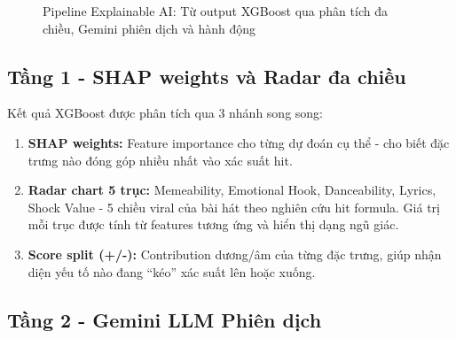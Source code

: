 \documentclass[12pt,a4paper]{report}
\begin{document}
\begin{figure}[H]
{
    }
    \caption{Pipeline Explainable AI: Từ output XGBoost qua phân tích đa chiều, Gemini phiên dịch và hành động}
    \label{fig:xai_pipeline}
\end{figure}

\subsection{Tầng 1 - SHAP weights và Radar đa chiều}

Kết quả XGBoost được phân tích qua 3 nhánh song song:
\begin{enumerate}
    \item \textbf{SHAP weights:} Feature importance cho từng dự đoán cụ thể - cho biết đặc trưng nào đóng góp nhiều nhất vào xác suất hit.
    \item \textbf{Radar chart 5 trục:} Memeability, Emotional Hook, Danceability, Lyrics, Shock Value - 5 chiều viral của bài hát theo nghiên cứu hit formula. Giá trị mỗi trục được tính từ features tương ứng và hiển thị dạng ngũ giác.
    \item \textbf{Score split (+/-):} Contribution dương/âm của từng đặc trưng, giúp nhận diện yếu tố nào đang ``kéo'' xác suất lên hoặc xuống.
\end{enumerate}

\subsection{Tầng 2 - Gemini LLM Phiên dịch}
\end{document}
